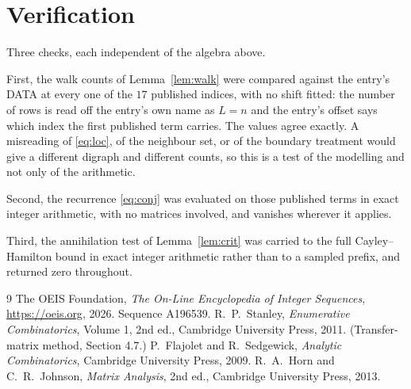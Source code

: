 \documentclass[11pt,a4paper]{article}
\theoremstyle{plain}
\theoremstyle{definition}
\begin{document}
\section{Verification}

Three checks, each independent of the algebra above.

First, the walk counts of Lemma~\ref{lem:walk} were compared against the entry's DATA at
every one of the $17$ published indices, with no shift fitted: the number of rows is
read off the entry's own name as $L=n$ and the entry's offset says which index the first
published term carries. The values agree exactly. A misreading of \eqref{eq:loc}, of the
neighbour set, or of the boundary treatment would give a different digraph and different
counts, so this is a test of the modelling and not only of the arithmetic.

Second, the recurrence \eqref{eq:conj} was evaluated on those published terms in exact
integer arithmetic, with no matrices involved, and vanishes wherever it applies.

Third, the annihilation test of Lemma~\ref{lem:crit} was carried to the full
Cayley--Hamilton bound in exact integer arithmetic rather than to a sampled prefix, and
returned zero throughout.

\begin{thebibliography}{9}
 The OEIS Foundation, \emph{The On-Line Encyclopedia of Integer
Sequences}, \url{https://oeis.org}, 2026. Sequence A196539.
 R.~P.~Stanley, \emph{Enumerative Combinatorics}, Volume 1, 2nd ed.,
Cambridge University Press, 2011. (Transfer-matrix method, Section 4.7.)
 P.~Flajolet and R.~Sedgewick, \emph{Analytic Combinatorics}, Cambridge
University Press, 2009.
 R.~A.~Horn and C.~R.~Johnson, \emph{Matrix Analysis}, 2nd ed., Cambridge
University Press, 2013.
\end{thebibliography}
\end{document}
